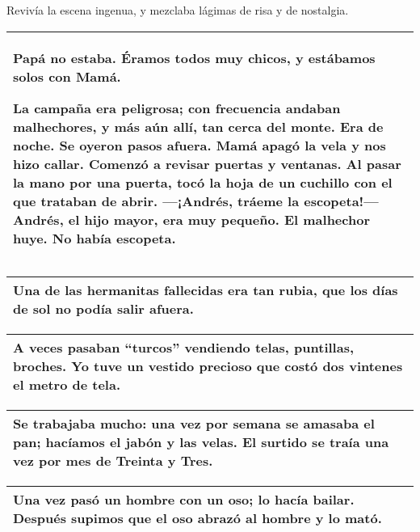 \documentclass[a4paper]{article}
\begin{document}
Revivía la escena ingenua, y mezclaba lágimas de risa y de nostalgia.

\begin{table}[htb]
    \centering
    \begin{tabular}{|p{10cm}|}
    \bottomrule
    Papá no estaba. Éramos todos muy chicos, y estábamos solos con Mamá.

    La campaña era peligrosa; con frecuencia andaban malhechores, y más aún allí, tan cerca del monte. Era de noche. Se oyeron pasos afuera. Mamá apagó la vela y nos hizo callar. Comenzó a revisar puertas y ventanas. Al pasar la mano por una puerta, tocó la hoja de un cuchillo con el que trataban de abrir. ---¡Andrés, tráeme la escopeta!--- Andrés, el hijo mayor, era muy pequeño. El malhechor huye. No había escopeta.\\
    \toprule
    \end{tabular}
\end{table}

\begin{table}[htb]
    \centering
    \begin{tabular}{|p{10cm}|}
    \bottomrule
    Una de las hermanitas fallecidas era tan rubia, que los días de sol no podía salir afuera.\\
    \toprule
    \end{tabular}
\end{table}

\begin{table}[ht]
    \centering
    \begin{tabular}{|p{10cm}|}
    \bottomrule
    A veces pasaban ``turcos'' vendiendo telas, puntillas, broches. Yo tuve un vestido precioso que costó dos vintenes el metro de tela.\\
    \toprule
    \end{tabular}
\end{table}

\begin{table}[ht]
    \centering
    \begin{tabular}{|p{10cm}|}
    \bottomrule
    Se trabajaba mucho: una vez por semana se amasaba el pan; ha\-cí\-amos el jabón y las velas. El surtido se traía una vez por mes de Treinta y Tres.\\
    \toprule
    \end{tabular}
\end{table}

\begin{table}[!ht]
    \centering
    \begin{tabular}{|p{10cm}|}
    \bottomrule
    Una vez pasó un hombre con un oso; lo hacía bailar. Después supimos que el oso abrazó al hombre y lo mató.\\
    \toprule
    \end{tabular}
\end{table}
\end{document}
